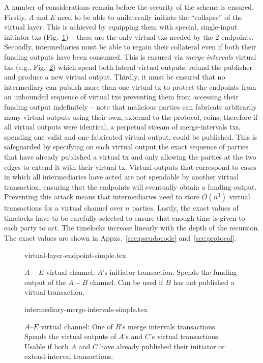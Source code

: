   A number of considerations remain before the security of the scheme is
  ensured. Firstly, $A$ and $E$ need to be able to unilaterally initiate the
  ``collapse'' of the virtual layer. This is achieved by equipping them with
  special, single-input initiator txs
  (Fig.~\ref{figure:virtual-layer-endpoint-simple}) -- these are the only virtual
  txs needed by the $2$ endpoints. Secondly, intermediaries must be able to
  regain their collateral even if both their funding outputs have been consumed.
  This is ensured via \emph{merge-intervals} virtual txs (e.g.,
  Fig.~\ref{figure:virtual-layer-merge-intervals-simple}) which spend both
  lateral virtual outputs, refund the publisher and produce a new virtual
  output. Thirdly, it must be ensured that no intermediary can publish more than
  one virtual tx to protect the endpoints from an unbounded sequence of virtual
  txs preventing them from accessing their funding output indefinitely -- note
  that malicious parties can fabricate arbitrarily many virtual outputs using
  their own, external to the protocol, coins, therefore if all virtual outputs
  were identical, a perpetual stream of merge-intervals txs, spending one valid
  and one fabricated virtual output, could be published. This is safeguarded by
  specifying on each virtual output the exact sequence of parties that have
  already published a virtual tx and only allowing the parties at the two edges
  to extend it with their virtual tx. Virtual outputs that correspond to cases
  in which all intermediaries have acted are not spendable by another virtual
  transaction, ensuring that the endpoints will eventually obtain a funding
  output. Preventing this attack means that intermediaries need to store
  $O(n^3)$ virtual transactions for a virtual channel over $n$ parties. Lastly,
  the exact values of timelocks have to be carefully selected to ensure that
  enough time is given to each party to act. The timelocks increase linearly
  with the depth of the recursion. The exact values are shown in
  Appxs.~\ref{sec:pseudocode} and~\ref{sec:protocol}.

  \begin{figure}[!htbp]
    {virtual-layer-endpoint-simple.tex}
    \caption{$A-E$ virtual channel: $A$'s initiator transaction. Spends the
    funding output of the $A-B$ channel. Can be used if $B$ has not published
    a virtual transaction.}
    \label{figure:virtual-layer-endpoint-simple}
  \end{figure}

  \begin{figure}[!htbp]
    {intermediary-merge-intervals-simple.tex}
    \caption{$A$--$E$ virtual channel: One of $B$'s merge intervals
    transactions. Spends the virtual outputs of $A$'s and $C$'s virtual
    transactions. Usable if both $A$ and $C$ have already published their
    initiator or extend-interval transactions.}
    \label{figure:virtual-layer-merge-intervals-simple}
  \end{figure}

